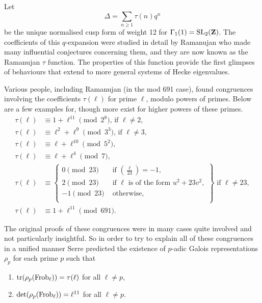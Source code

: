 \documentclass[a4paper,12pt]{article}
\begin{document}
\begin{ex}\label{ex:delt}
Let
\[
\Delta = \sum_{n \ge 1} \tau(n) q^n
\]
be the unique normalised cusp form of weight 12 for $\Gamma_1(1) = \operatorname{SL}_2(\mathbf{Z})$.
The coefficients of this $q$-expansion were studied in detail by Ramanujan who made many influential conjectures concerning them, and they are now known as the Ramanujan $\tau$ function.
The properties of this function provide the first glimpses of behaviours that extend to more general systems of Hecke eigenvalues.

Various people, including Ramanujan (in the mod 691 case), found congruences involving the coefficients $\tau(\ell)$ for prime $\ell$, modulo powers of primes.
Below are a few examples for, though more exist for higher powers of these primes.
\begin{align}
\tau(\ell) &\equiv 1 + \ell^{11} \pmod{2^8}\text{, if } \ell \ne 2,\label{eq:tau2}\\
\tau(\ell) &\equiv \ell^2 + \ell^9 \pmod{3^3}\text{, if } \ell \ne 3,\label{eq:tau3}\\
\tau(\ell) &\equiv \ell + \ell^{10} \pmod{5^2},\label{eq:tau5}\\
\tau(\ell) &\equiv \ell + \ell^4 \pmod{7},\label{eq:tau7}\\
\tau(\ell) &\equiv\left.\begin{cases}
0\pmod{23} & \text{ if } \left(\frac{\ell}{23}\right) = -1,\\
2\pmod{23} & \text{ if }\ell\text{ is of the form } u^2 + 23v^2,\\
-1\pmod{23} & \text{ otherwise},\\
\end{cases}\right\}\text{ if } \ell \ne 23,\label{eq:tau23}\\
\tau(\ell) &\equiv 1 + \ell^{11} \pmod{691}.\label{eq:tau691}
\end{align}

The original proofs of these congruences were in many cases quite involved and not particularly insightful. %
So in order to try to explain all of these congruences in a unified manner Serre predicted \cite{Serre67} the existence of $p$-adic Galois representations $\rho_p$ for each prime $p$ such that
\begin{enumerate}
\item $\operatorname{tr}(\rho_p (\operatorname{Frob}_\ell)) = \tau(\ell)$ for all $\ell \ne p$,\label{item:trace}
\item $\det(\rho_p (\operatorname{Frob}_\ell)) = \ell^{11}$ for all $\ell \ne p$.\label{item:det}
\end{enumerate}


\end{ex}
\end{document}
